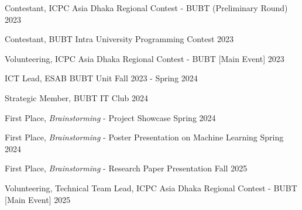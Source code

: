 Contestant, ICPC Asia Dhaka Regional Contest - BUBT (Preliminary Round) \hfill 2023

Contestant, BUBT Intra University Programming Contest \hfill 2023

Volunteering, ICPC Asia Dhaka Regional Contest - BUBT [Main Event] \hfill 2023

ICT Lead, ESAB BUBT Unit \hfill Fall 2023 - Spring 2024

Strategic Member, BUBT IT Club \hfill 2024

First Place, \textit{Brainstorming} - Project Showcase \hfill Spring 2024

First Place, \textit{Brainstorming} - Poster Presentation on Machine Learning \hfill Spring 2024

First Place, \textit{Brainstorming} - Research Paper Presentation \hfill Fall 2025

Volunteering, Technical Team Lead, ICPC Asia Dhaka Regional Contest - BUBT [Main Event] \hfill 2025


